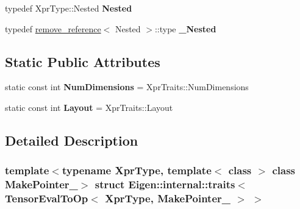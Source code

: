 \begin{DoxyCompactItemize}
\item 
\mbox{\label{struct_eigen_1_1internal_1_1traits_3_01_tensor_eval_to_op_3_01_xpr_type_00_01_make_pointer___01_4_01_4_a1648056e01edf3d38b0f6c4515eb2afa}} 
typedef Xpr\+Type\+::\+Nested {\bfseries Nested}
\item 
\mbox{\label{struct_eigen_1_1internal_1_1traits_3_01_tensor_eval_to_op_3_01_xpr_type_00_01_make_pointer___01_4_01_4_a792ae8cccb0f4309262a94ec2b9a35e2}} 
typedef \hyperlink{struct_eigen_1_1internal_1_1remove__reference}{remove\+\_\+reference}$<$ Nested $>$\+::type {\bfseries \+\_\+\+Nested}
\end{DoxyCompactItemize}
\subsection*{Static Public Attributes}
\begin{DoxyCompactItemize}
\item 
\mbox{\label{struct_eigen_1_1internal_1_1traits_3_01_tensor_eval_to_op_3_01_xpr_type_00_01_make_pointer___01_4_01_4_a822ce505e7ef62b81a98b6d34d166538}} 
static const int {\bfseries Num\+Dimensions} = Xpr\+Traits\+::\+Num\+Dimensions
\item 
\mbox{\label{struct_eigen_1_1internal_1_1traits_3_01_tensor_eval_to_op_3_01_xpr_type_00_01_make_pointer___01_4_01_4_a31dbca45648bcfdfb12f53e9b243f893}} 
static const int {\bfseries Layout} = Xpr\+Traits\+::\+Layout
\end{DoxyCompactItemize}


\subsection{Detailed Description}
\subsubsection*{template$<$typename Xpr\+Type, template$<$ class $>$ class Make\+Pointer\+\_\+$>$\newline
struct Eigen\+::internal\+::traits$<$ Tensor\+Eval\+To\+Op$<$ Xpr\+Type, Make\+Pointer\+\_\+ $>$ $>$}



